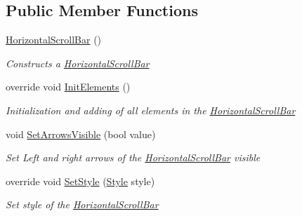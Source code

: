 \subsection*{Public Member Functions}
\begin{DoxyCompactItemize}
\item 
\mbox{\hyperlink{class_space_v_i_l_1_1_horizontal_scroll_bar_ae2deb22bc8679c96c968a955f3796806}{Horizontal\+Scroll\+Bar}} ()
\begin{DoxyCompactList}\small\item\em Constructs a \mbox{\hyperlink{class_space_v_i_l_1_1_horizontal_scroll_bar}{Horizontal\+Scroll\+Bar}} \end{DoxyCompactList}\item 
override void \mbox{\hyperlink{class_space_v_i_l_1_1_horizontal_scroll_bar_a28b7659ed7580fee8b4bf4fb951f1daa}{Init\+Elements}} ()
\begin{DoxyCompactList}\small\item\em Initialization and adding of all elements in the \mbox{\hyperlink{class_space_v_i_l_1_1_horizontal_scroll_bar}{Horizontal\+Scroll\+Bar}} \end{DoxyCompactList}\item 
void \mbox{\hyperlink{class_space_v_i_l_1_1_horizontal_scroll_bar_a5fb41915b15f89e13da665dab8fa3b31}{Set\+Arrows\+Visible}} (bool value)
\begin{DoxyCompactList}\small\item\em Set Left and right arrows of the \mbox{\hyperlink{class_space_v_i_l_1_1_horizontal_scroll_bar}{Horizontal\+Scroll\+Bar}} visible \end{DoxyCompactList}\item 
override void \mbox{\hyperlink{class_space_v_i_l_1_1_horizontal_scroll_bar_ab871a5c2d291dadd8c902efd361079d5}{Set\+Style}} (\mbox{\hyperlink{class_space_v_i_l_1_1_decorations_1_1_style}{Style}} style)
\begin{DoxyCompactList}\small\item\em Set style of the \mbox{\hyperlink{class_space_v_i_l_1_1_horizontal_scroll_bar}{Horizontal\+Scroll\+Bar}} \end{DoxyCompactList}\end{DoxyCompactItemize}
